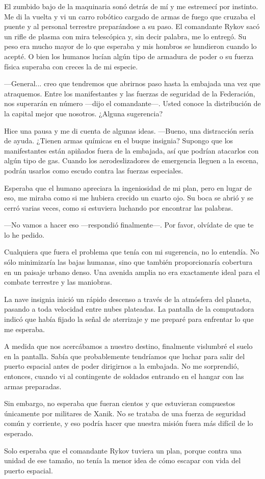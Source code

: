 El zumbido bajo de la maquinaria sonó detrás de mí y me estremecí por instinto. Me di la vuelta y vi un carro robótico cargado de armas de fuego que cruzaba el puente y al personal terrestre preparándose a su paso. El comandante Rykov sacó un rifle de plasma con mira telescópica y, sin decir palabra, me lo entregó. Su peso era mucho mayor de lo que esperaba y mis hombros se hundieron cuando lo acepté. O bien los humanos lucían algún tipo de armadura de poder o su fuerza física superaba con creces la de mi especie.

—General... creo que tendremos que abrirnos paso hasta la embajada una vez que atraquemos. Entre los manifestantes y las fuerzas de seguridad de la Federación, nos superarán en número —dijo el comandante—. Usted conoce la distribución de la capital mejor que nosotros. ¿Alguna sugerencia?

Hice una pausa y me di cuenta de algunas ideas. —Bueno, una distracción sería de ayuda. ¿Tienen armas químicas en el buque insignia? Supongo que los manifestantes están apiñados fuera de la embajada, así que podrían atacarlos con algún tipo de gas. Cuando los aerodeslizadores de emergencia lleguen a la escena, podrán usarlos como escudo contra las fuerzas especiales.

Esperaba que el humano apreciara la ingeniosidad de mi plan, pero en lugar de eso, me miraba como si me hubiera crecido un cuarto ojo. Su boca se abrió y se cerró varias veces, como si estuviera luchando por encontrar las palabras.

—No vamos a hacer eso —respondió finalmente—. Por favor, olvídate de que te lo he pedido.

Cualquiera que fuera el problema que tenía con mi sugerencia, no lo entendía. No sólo minimizaría las bajas humanas, sino que también proporcionaría cobertura en un paisaje urbano denso. Una avenida amplia no era exactamente ideal para el combate terrestre y las maniobras.

La nave insignia inició un rápido descenso a través de la atmósfera del planeta, pasando a toda velocidad entre nubes plateadas. La pantalla de la computadora indicó que había fijado la señal de aterrizaje y me preparé para enfrentar lo que me esperaba.

A medida que nos acercábamos a nuestro destino, finalmente vislumbré el suelo en la pantalla. Sabía que probablemente tendríamos que luchar para salir del puerto espacial antes de poder dirigirnos a la embajada. No me sorprendió, entonces, cuando vi al contingente de soldados entrando en el hangar con las armas preparadas.

Sin embargo, no esperaba que fueran cientos y que estuvieran compuestos únicamente por militares de Xanik. No se trataba de una fuerza de seguridad común y corriente, y eso podría hacer que nuestra misión fuera más difícil de lo esperado.

Solo esperaba que el comandante Rykov tuviera un plan, porque contra una unidad de ese tamaño, no tenía la menor idea de cómo escapar con vida del puerto espacial.